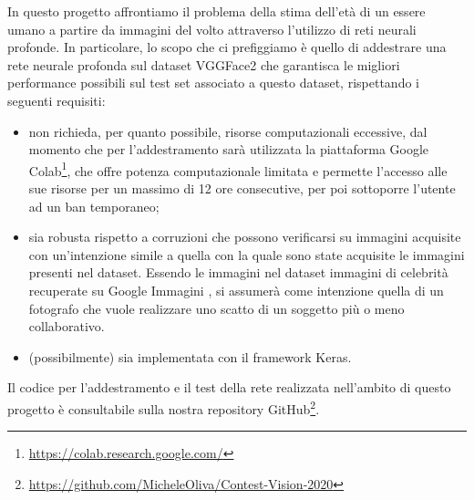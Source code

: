 In questo progetto affrontiamo il problema della stima dell'età di un essere umano a partire da immagini del volto attraverso l'utilizzo di reti neurali profonde. 
In particolare, lo scopo che ci prefiggiamo è quello di addestrare una rete neurale profonda sul dataset VGGFace2 \cite{vggface2dataset} che garantisca le migliori performance possibili sul test set associato a questo dataset, rispettando i seguenti requisiti:

\begin{itemize}
	\item non richieda, per quanto possibile, risorse computazionali eccessive, dal momento che per l'addestramento sarà utilizzata la piattaforma Google Colab\footnote{\url{https://colab.research.google.com/}}, che offre potenza computazionale limitata e permette l'accesso alle sue risorse per un massimo di 12 ore consecutive, per poi sottoporre l'utente ad un ban temporaneo; 
	\item \label{sec:intro.intention}sia robusta rispetto a corruzioni che possono verificarsi su immagini acquisite con un'intenzione simile a quella con la quale sono state acquisite le immagini presenti nel dataset.
Essendo le immagini nel dataset immagini di celebrità recuperate su Google Immagini \cite{vggface2dataset}, si assumerà come intenzione quella di un fotografo che vuole realizzare uno scatto di un soggetto più o meno collaborativo.
	\item (possibilmente) sia implementata con il framework Keras.
\end{itemize}

Il codice per l’addestramento e il test della rete realizzata nell’ambito di questo progetto è consultabile sulla nostra repository GitHub\footnote{\url{https://github.com/MicheleOliva/Contest-Vision-2020}}.